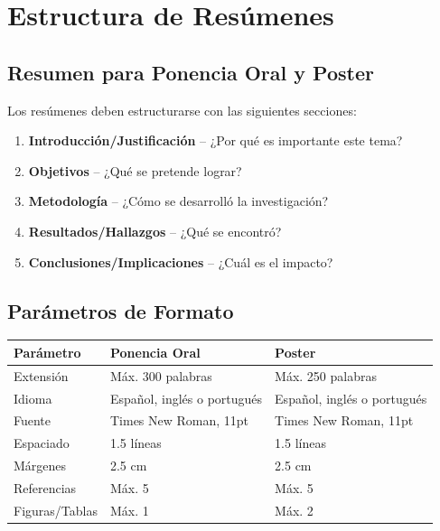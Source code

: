 \documentclass[12pt,a4paper]{article}
\begin{document}
\section{Estructura de Resúmenes}

\subsection{Resumen para Ponencia Oral y Poster}

Los resúmenes deben estructurarse con las siguientes secciones:

\begin{tcolorbox}[cajainfo, title=Estructura estándar]
\begin{enumerate}[label={\textcolor{verdemid}{\textbf{\arabic{*}.}}}]
  \item \textbf{Introducción/Justificación} -- ¿Por qué es importante este tema?
  \item \textbf{Objetivos} -- ¿Qué se pretende lograr?
  \item \textbf{Metodología} -- ¿Cómo se desarrolló la investigación?
  \item \textbf{Resultados/Hallazgos} -- ¿Qué se encontró?
  \item \textbf{Conclusiones/Implicaciones} -- ¿Cuál es el impacto?
\end{enumerate}
\end{tcolorbox}

\subsection{Parámetros de Formato}

\begin{table}[H]
\centering
\small
\begin{tabular}{|l|l|l|}
\hline
\rowcolor{verdeclaro}
\textbf{Parámetro} & \textbf{Ponencia Oral} & \textbf{Poster} \\
\hline
Extensión & Máx. 300 palabras & Máx. 250 palabras \\
\hline
Idioma & Español, inglés o portugués & Español, inglés o portugués \\
\hline
Fuente & Times New Roman, 11pt & Times New Roman, 11pt \\
\hline
Espaciado & 1.5 líneas & 1.5 líneas \\
\hline
Márgenes & 2.5 cm & 2.5 cm \\
\hline
Referencias & Máx. 5 & Máx. 5 \\
\hline
Figuras/Tablas & Máx. 1 & Máx. 2 \\
\hline
\end{tabular}
\end{table}
\end{document}
